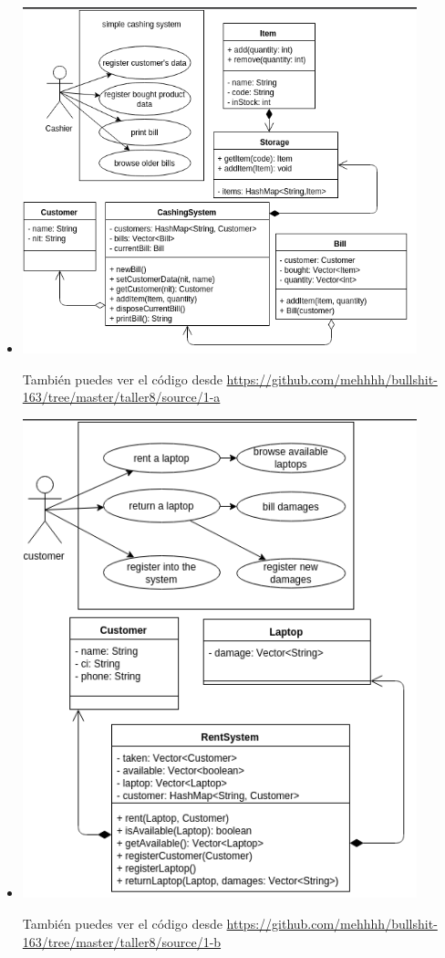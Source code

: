 \begin{itemize}

\item \includegraphics[width=0.9\textwidth]{img/1-a.png}

También puedes ver el código desde \url{https://github.com/mehhhh/bullshit-163/tree/master/taller8/source/1-a}






\item \includegraphics[width=0.9\textwidth]{img/1-b.png}

También puedes ver el código desde \url{https://github.com/mehhhh/bullshit-163/tree/master/taller8/source/1-b}





\end{itemize}
